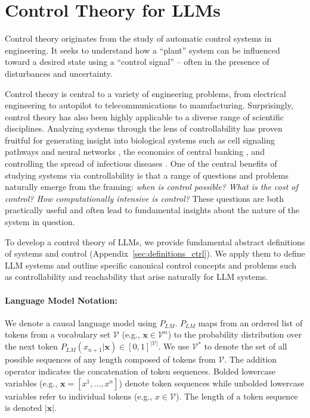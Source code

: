 \documentclass{article} %
\begin{document}
\section{Control Theory for LLMs}
\label{sec:ctrl_theory_llms}
Control theory originates from the study of automatic control systems in engineering. It seeks to understand how a ``plant'' system can be influenced toward a desired state using a ``control signal'' -- often in the presence of disturbances and uncertainty. 

Control theory is central to a variety of engineering problems, from electrical engineering to autopilot to telecommunications to manufacturing. Surprisingly, control theory has also been highly applicable to a diverse range of scientific disciplines. Analyzing systems through the lens of controllability has proven fruitful for generating insight into biological systems such as cell signaling pathways and neural networks \citep{yi2000robust}, the economics of central banking \citep{anicta2011introduction}, and controlling the spread of infectious diseases \citep{virus_control}. One of the central benefits of studying systems via controllability is that a range of questions and problems naturally emerge from the framing: \textit{when is control possible? What is the cost of control? How computationally intensive is control?} These questions are both practically useful and often lead to fundamental insights about the nature of the system in question. 



To develop a control theory of LLMs, we provide fundamental abstract definitions of systems and control (Appendix~\ref{sec:definitions_ctrl}). We apply them to define LLM systems and outline specific canonical control concepts and problems such as controllability and reachability that arise naturally for LLM systems. 

\paragraph{Language Model Notation: } We denote a causal language model using $P_{LM}$. $P_{LM}$ maps from an ordered list of tokens from a vocabulary set $\mathcal V$ (e.g., $\mathbf x \in \mathcal V^n$) to the probability distribution over the next token $P_{LM}(x_{n+1} |\mathbf x) \in [0,1]^{|\mathcal V|}$. We use $\mathcal V^*$ to denote the set of all possible sequences of any length composed of tokens from $\mathcal V$. The addition operator indicates the concatenation of token sequences. Bolded lowercase variables (e.g., $\mathbf x = [x^1, \dots, x^n]$) denote token sequences while unbolded lowercase variables refer to individual tokens (e.g., $x\in \mathcal V$). The length of a token sequence is denoted $|\mathbf x|$. 
\end{document}
